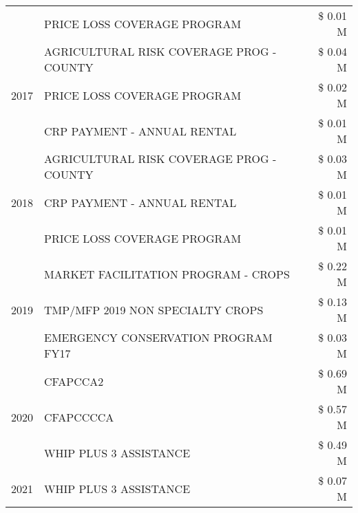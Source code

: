 \begin{tabular}{llr}
 & PRICE LOSS COVERAGE PROGRAM & \$ 0.01 M \\
\cline{1-3}
\multirow[t]{3}{*}{2017} & AGRICULTURAL RISK COVERAGE PROG - COUNTY & \$ 0.04 M \\
 & PRICE LOSS COVERAGE PROGRAM & \$ 0.02 M \\
 & CRP PAYMENT - ANNUAL RENTAL & \$ 0.01 M \\
\cline{1-3}
\multirow[t]{3}{*}{2018} & AGRICULTURAL RISK COVERAGE PROG - COUNTY & \$ 0.03 M \\
 & CRP PAYMENT - ANNUAL RENTAL & \$ 0.01 M \\
 & PRICE LOSS COVERAGE PROGRAM & \$ 0.01 M \\
\cline{1-3}
\multirow[t]{3}{*}{2019} & MARKET FACILITATION PROGRAM - CROPS & \$ 0.22 M \\
 & TMP/MFP 2019 NON SPECIALTY CROPS & \$ 0.13 M \\
 & EMERGENCY CONSERVATION PROGRAM FY17 & \$ 0.03 M \\
\cline{1-3}
\multirow[t]{3}{*}{2020} & CFAPCCA2 & \$ 0.69 M \\
 & CFAPCCCCA & \$ 0.57 M \\
 & WHIP PLUS 3 ASSISTANCE & \$ 0.49 M \\
\cline{1-3}
2021 & WHIP PLUS 3 ASSISTANCE & \$ 0.07 M \\
\cline{1-3}
\bottomrule
\end{tabular}

